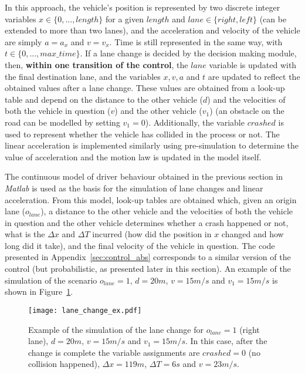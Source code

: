 In this approach, the vehicle's position is represented by two discrete integer variables $x \in \{0,...,length\}$ for a given $length$ and $lane \in \{right, left\}$ (can be extended to more than two lanes), and the acceleration and velocity of the vehicle are simply $a = a_x$ and $v = v_x$. Time is still represented in the same way, with $t \in \{0,...,max\_time\}$. If a lane change is decided by the decision making module, then, \textbf{within one transition of the control}, the $lane$ variable is updated with the final destination lane, and the variables $x, v, a$ and $t$ are updated to reflect the obtained values after a lane change. These values are obtained from a look-up table and depend on the distance to the other vehicle ($d$) and the velocities of both the vehicle in question ($v$) and the other vehicle ($v_1$) (an obstacle on the road can be modelled by setting $v_1 = 0$). Additionally, the variable $crashed$ is used to represent whether the vehicle has collided in the process or not. The linear acceleration is implemented similarly using pre-simulation to determine the value of acceleration and the motion law is updated in the model itself.

The continuous model of driver behaviour obtained in the previous section in \textit{Matlab} is used as the basis for the simulation of lane changes and linear acceleration. From this model, look-up tables are obtained which, given an origin lane ($o_{lane}$), a distance to the other vehicle and the velocities of both the vehicle in question and the other vehicle determines whether a crash happened or not, what is the $\Delta x$ and $\Delta T$ incurred (how did the position in $x$ changed and how long did it take), and the final velocity of the vehicle in question. The code presented in Appendix~\ref{sec:control_abs} corresponds to a similar version of the control (but probabilistic, as presented later in this section). An example of the simulation of the scenario $o_{lane} = 1$, $d = 20m$, $v = 15m/s$ and $v_1 = 15m/s$ is shown in Figure~\ref{fig:lane_change_ex}.

\begin{figure}[h]
    \centering
    \texttt{[image: lane\_change\_ex.pdf]}
    \caption{Example of the simulation of the lane change for $o_{lane} = 1$ (right lane), $d = 20m$, $v = 15m/s$ and $v_1 = 15m/s$. In this case, after the change is complete the variable assignments are $crashed = 0$ (no collision happened), $\Delta x = 119m$, $\Delta T = 6s$ and $v = 23m/s$.}
    \label{fig:lane_change_ex}
\end{figure}

